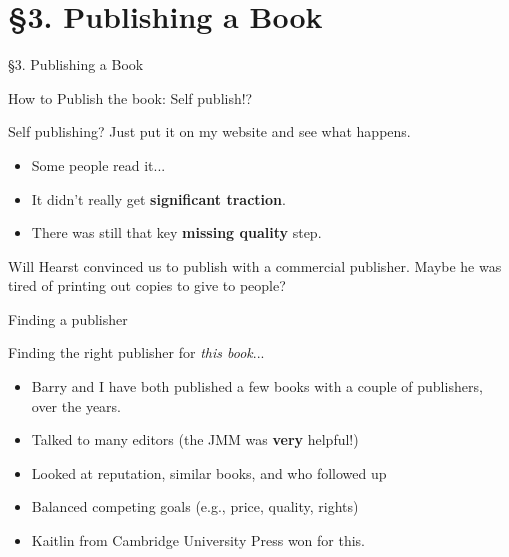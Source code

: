 \documentclass{beamer}
\newcommand{\mysection}[2]{\section{\S#1. #2}%
\begin{frame}{}
\vfill
\begin{center}
\hrulefill
\vfill
\Huge\sc \S#1. #2
\vfill
\hrulefill
\end{center}
\vfill
\end{frame}}
\begin{document}
\mysection{3}{Publishing a Book}

\begin{frame}{How to Publish the book:  Self publish!?}
\begin{block}{Self publishing?}
    Just put it on my website and see what happens.
          \begin{itemize}
            \item Some people read it...
            \item It didn't really get \textbf{significant traction}.
            \item There was still that key \textbf{missing quality} step.
          \end{itemize}
          \end{block}
          \vfill
Will Hearst convinced us to publish with a commercial publisher.
Maybe he was tired of printing out copies to give to people?
\end{frame}

\begin{frame}{Finding a publisher}
\begin{block}{Finding the right publisher for {\em this book}...}
  \begin{itemize}
  \item Barry and I have both published a few books with a couple of publishers, over the years.
    \item Talked to many editors (the JMM was \textbf{very} helpful!)
    \item Looked at reputation, similar books, and who followed up
    \item Balanced competing goals (e.g., price, quality, rights)
    \item Kaitlin from Cambridge University Press won for this.
  \end{itemize}
  \end{block}
\end{frame}
\end{document}
